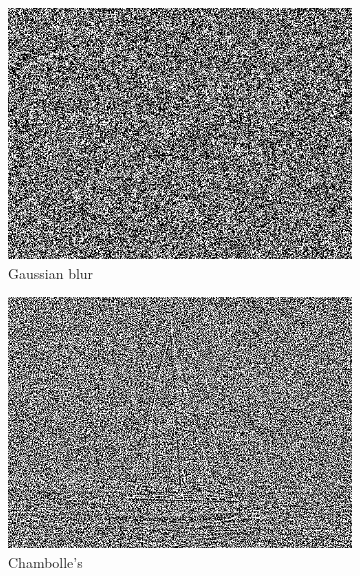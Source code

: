\documentclass[11pt]{article}
\begin{document}
\begin{figure}
\centering
\graphicspath{{images/}}
\begin{subfigure}[b]{0.4\textwidth}
\centering
\includegraphics[width=\textwidth]{sail_gauss_diff}
\caption{Gaussian blur}
\label{sail:gauss:diff}
\end{subfigure}
\begin{subfigure}[b]{0.4\textwidth}
\centering
\includegraphics[width=\textwidth]{sail_ch_diff}
\caption{Chambolle's}
\label{sail:ch:diff}
\end{subfigure}
\begin{subfigure}[b]{0.4\textwidth}
\centering

\end{subfigure}
\end{figure}
\end{document}
